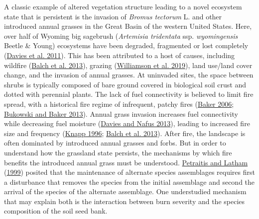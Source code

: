 \documentclass[
  12pt,
]{article}
\begin{document}
A classic example of altered vegetation structure leading to a novel
ecosystem state that is persistent is the invasion of \emph{Bromus
tectorum} L. and other introduced annual grasses in the Great Basin of
the western United States. Here, over half of Wyoming big sagebrush
(\emph{Artemisia tridentata} ssp. \emph{wyomingensis} Beetle \& Young)
ecosystems have been degraded, fragmented or lost completely
(\protect\hyperlink{ref-Davies2011}{Davies et al. 2011}). This has been
attributed to a host of causes, including wildfire
(\protect\hyperlink{ref-Balch2013}{Balch et al. 2013}), grazing
(\protect\hyperlink{ref-Williamson2019}{Williamson et al. 2019}), land
use/land cover change, and the invasion of annual grasses. At uninvaded
sites, the space between shrubs is typically composed of bare ground
covered in biological soil crust and dotted with perennial plants. The
lack of fuel connectivity is believed to limit fire spread, with a
historical fire regime of infrequent, patchy fires
(\protect\hyperlink{ref-Baker2006}{Baker 2006};
\protect\hyperlink{ref-Bukowski2013}{Bukowski and Baker 2013}). Annual
grass invasion increases fuel connectivity while decreasing fuel
moisture (\protect\hyperlink{ref-Davies2013}{Davies and Nafus 2013}),
leading to increased fire size and frequency
(\protect\hyperlink{ref-Knapp1996}{Knapp 1996};
\protect\hyperlink{ref-Balch2013}{Balch et al. 2013}). After fire, the
landscape is often dominated by introduced annual grasses and forbs. But
in order to understand how the grassland state persists, the mechanisms
by which fire benefits the introduced annual grass must be understood.
\protect\hyperlink{ref-Petraitis1999}{Petraitis and Latham}
(\protect\hyperlink{ref-Petraitis1999}{1999}) posited that the
maintenance of alternate species assemblages requires first a
disturbance that removes the species from the initial assemblage and
second the arrival of the species of the alternate assemblage. One
understudied mechanism that may explain both is the interaction between
burn severity and the species composition of the soil seed bank.
\end{document}

